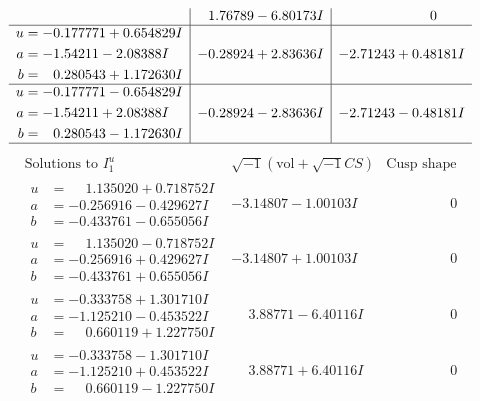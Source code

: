 \documentclass[1p]{elsarticle_modified}
\theoremstyle{definition}
\newcommand{\I}{\sqrt{-1}}
\begin{document}
$$\begin{array}{c|c|c}
 & \phantom{-}1.76789 - 6.80173 I & \phantom{-0.000000 } 0 \\ \hline\begin{aligned}
u &= -0.177771 + 0.654829 I \\
a &= -1.54211 - 2.08388 I \\
b &= \phantom{-}0.280543 + 1.172630 I\end{aligned}
 & -0.28924 + 2.83636 I & -2.71243 + 0.48181 I \\ \hline\begin{aligned}
u &= -0.177771 - 0.654829 I \\
a &= -1.54211 + 2.08388 I \\
b &= \phantom{-}0.280543 - 1.172630 I\end{aligned}
 & -0.28924 - 2.83636 I & -2.71243 - 0.48181 I\\
 \hline 
 \end{array}$$\newpage$$\begin{array}{c|c|c}  
\text{Solutions to }I^u_{1}& \I (\text{vol} + \sqrt{-1}CS) & \text{Cusp shape}\\
 \hline 
\begin{aligned}
u &= \phantom{-}1.135020 + 0.718752 I \\
a &= -0.256916 - 0.429627 I \\
b &= -0.433761 - 0.655056 I\end{aligned}
 & -3.14807 - 1.00103 I & \phantom{-0.000000 } 0 \\ \hline\begin{aligned}
u &= \phantom{-}1.135020 - 0.718752 I \\
a &= -0.256916 + 0.429627 I \\
b &= -0.433761 + 0.655056 I\end{aligned}
 & -3.14807 + 1.00103 I & \phantom{-0.000000 } 0 \\ \hline\begin{aligned}
u &= -0.333758 + 1.301710 I \\
a &= -1.125210 - 0.453522 I \\
b &= \phantom{-}0.660119 + 1.227750 I\end{aligned}
 & \phantom{-}3.88771 - 6.40116 I & \phantom{-0.000000 } 0 \\ \hline\begin{aligned}
u &= -0.333758 - 1.301710 I \\
a &= -1.125210 + 0.453522 I \\
b &= \phantom{-}0.660119 - 1.227750 I\end{aligned}
 & \phantom{-}3.88771 + 6.40116 I & \phantom{-0.000000 } 0 \\ \hline\begin{aligned}

\end{aligned}
\end{array}$$
\end{document}
